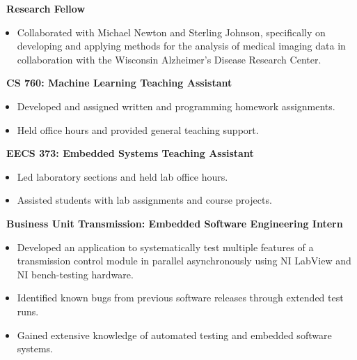\documentclass[]{article}
\begin{document}
 \newline
{\bf \ Research Fellow}
\begin{itemize}[label={$\bullet$}]
	\item Collaborated with Michael Newton and Sterling Johnson, specifically on developing and applying methods for the analysis of medical imaging data in collaboration with the Wisconsin Alzheimer's Disease Research Center.
\end{itemize} 

 \newline
{\bf \ CS 760: Machine Learning Teaching Assistant}
\begin{itemize}[label={$\bullet$}]
	\item Developed and assigned written and programming homework assignments.
	\item Held office hours and provided general teaching support.
\end{itemize} 

 \newline
{\bf \ EECS 373: Embedded Systems Teaching Assistant}
\begin{itemize}[label={$\bullet$}]
	\item Led laboratory sections and held lab office hours.
	\item Assisted students with lab assignments and course projects.
\end{itemize}

 \newline
{\bf \ Business Unit Transmission: Embedded Software Engineering Intern}
\begin{itemize}[label={$\bullet$}]
	\item Developed an application to systematically test multiple features of a transmission control module in parallel asynchronously using NI LabView and NI bench-testing hardware.
	\item Identified known bugs from previous software releases through extended test runs.
	\item Gained extensive knowledge of automated testing and embedded software systems.
\end{itemize}
\end{document}
